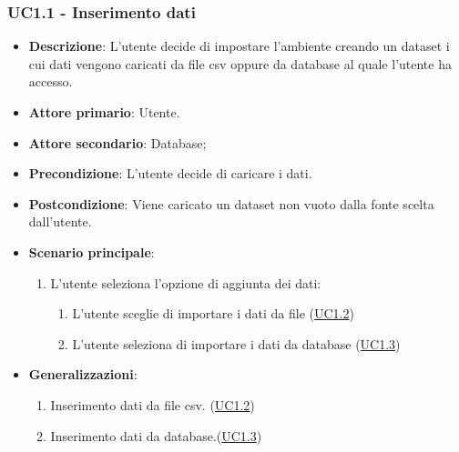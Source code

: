 \subsubsection{UC1.1 - Inserimento dati}
\label{ssub:uc1.1}
\begin{itemize}
    \item \textbf{Descrizione}: L'utente decide di impostare l'ambiente creando un dataset i cui 
                                dati vengono caricati da file csv oppure da database al quale l'utente ha accesso.

    \item \textbf{Attore primario}: Utente.
    \item \textbf{Attore secondario}: Database;
    
    \item \textbf{Precondizione}:   L'utente decide di caricare i dati.

    \item \textbf{Postcondizione}:  Viene caricato un dataset non vuoto dalla fonte scelta dall'utente. 

	\item \textbf{Scenario principale}:
		\begin{enumerate}
			\item L'utente seleziona l'opzione di aggiunta dei dati:
            \begin{enumerate}
                \item L'utente sceglie di importare i dati da file (\hyperref[ssub:uc1.2]{UC1.2})
                \item L'utente seleziona di importare i dati da database (\hyperref[ssub:uc1.3]{UC1.3})
            \end{enumerate}
        \end{enumerate}

        \item \textbf{Generalizzazioni}:
        \begin{enumerate}
            \item Inserimento dati da file csv. (\hyperref[ssub:uc1.2]{UC1.2})
            \item Inserimento dati da database.(\hyperref[ssub:uc1.3]{UC1.3})
        \end{enumerate}
\end{itemize}


